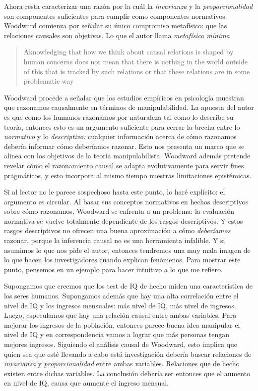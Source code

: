 {{Ahora resta caracterizar una razón por la cuál la
\emph{invarianza} y la \emph{proporcionalidad} son
componentes suficientes para cumplir como componentes
normativos. Woodward comienza por señalar su único
compromiso metafísico: que las relaciones causales son
objetivas. Lo que el autor llama \emph{metafísica mínima}

 \begin{quote}
    Aknowledging that how we think about causal relations is
    shaped by human concerns does not mean that there is
    nothing in the world outside of this that is tracked by
    such relations or that these relations are  in some problematic way
  \end{quote}


Woodward procede a señalar que los estudios empíricos en
psicología muestran que razonamos causalmente en términos de
manipulabilidad. La apuesta del autor es que como los
humanos razonamos por naturaleza tal como lo describe su
teoría, entonces esto es un argumento suficiente para cerrar
la brecha entre lo \emph{normativo} y lo \emph{descriptivo:}
cualquier información acerca de cómo razonamos debería
informar cómo deberíamos razonar. Esto nos presenta un
marco que se alinea con los objetivos de la teoría
manipulabilista. Woodward además pretende revelar cómo el
razonamiento causal se adapta evolutivamente para servir
fines pragmáticos, y esto incorpora al mismo tiempo
nuestras limitaciones epistémicas.

Si al lector no le parece sospechoso hasta este punto, lo
haré explícito: el argumento es circular. Al basar sus
conceptos normativos en hechos descriptivos sobre cómo
razonamos, Woodward se enfrenta a un problema: la
evaluación normativa se vuelve totalmente dependiente de los
rasgos descriptivos. Y estos rasgos descriptivos no ofrecen
una buena aproximación a cómo \emph{deberíamos} razonar,
porque la inferencia causal no es una herramienta infalible.
Y si asumimos lo que nos pide el autor, entonces tendremos
una muy mala imagen de lo que hacen los investigadores
cuando explican fenómenos. Para mostrar este punto, pensemos
en un ejemplo para hacer intuitivo a lo que me refiero.

Supongamos que creemos que los test de IQ de hecho miden una
característica de los seres humanos. Supongamos además que
hay una alta correlación entre el nivel de IQ y los ingresos
mensuales: más nivel de IQ, más nivel de ingresos. Luego,
especulamos que hay una relación causal entre ambas
variables. Para mejorar los ingresos de la población,
entonces parece buena idea manipular el nivel de IQ y en
correspondencia vamos a lograr que más personas tengan
mejores ingresos. Siguiendo el análisis causal de Woodward,
esto implica que quien sea que esté llevando a cabo está
investigación debería buscar relaciones de
\emph{invarianza} y \emph{proporcionalidad} entre ambas
variables. Relaciones que de hecho existen entre dichas
variables. La conclusión debería ser entonces que el aumento
en nivel de IQ, causa que aumente el ingreso mensual.

}}
